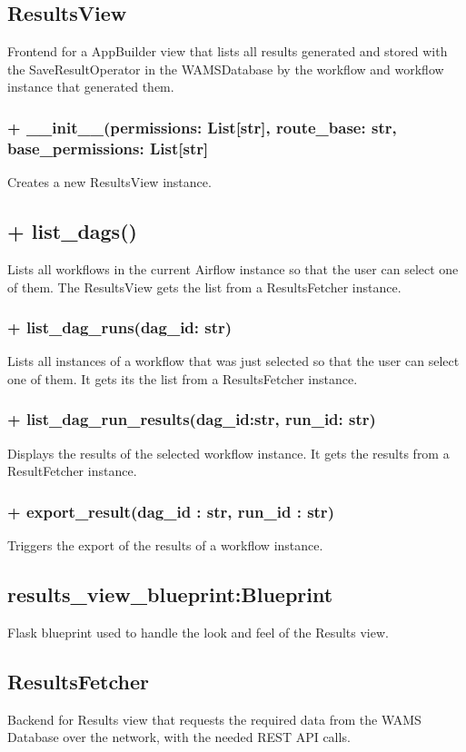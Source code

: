 \subsection{ResultsView}
Frontend for a AppBuilder view that lists all results generated and stored with the SaveResultOperator in the WAMSDatabase by the workflow and workflow instance that generated them.

\subsubsection{+ \_\_init\_\_(permissions: List[str], route\_base: str, base\_permissions: List[str]}
Creates a new ResultsView instance.

\subsection{+ list\_dags()}
Lists all workflows in the current Airflow instance so that the user can select one of them.
The ResultsView gets the list from a ResultsFetcher instance.

\subsubsection{+ list\_dag\_runs(dag\_id: str)}
Lists all instances of a workflow that was just selected so that the user can select one of them.
It gets its the list from a ResultsFetcher instance.

\subsubsection{+ list\_dag\_run\_results(dag\_id:str, run\_id: str)}
Displays the results of the selected workflow instance.
It gets the results from a ResultFetcher instance.

\subsubsection{+ export\_result(dag\_id : str, run\_id : str)}
Triggers the export of the results of a workflow instance.



\subsection{results\_view\_blueprint:Blueprint}
Flask blueprint used to handle the look and feel of the Results view.

\subsection{ResultsFetcher}
Backend for Results view that requests the required data from the WAMS Database over the network,
with the needed REST API calls.

